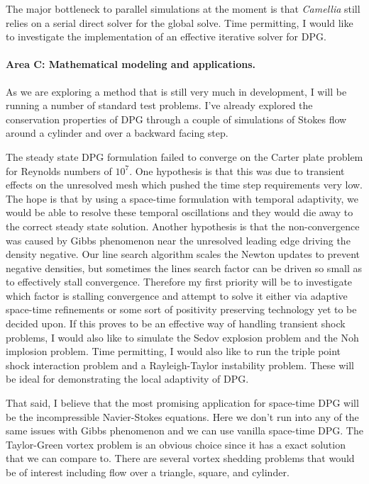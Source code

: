 \documentclass[Proposal.tex]{subfiles}
\begin{document}
The major bottleneck to parallel simulations at the moment is that \emph{Camellia} still relies on a serial direct solver for the global solve.
Time permitting, I would like to investigate the implementation of an effective iterative solver for DPG.

\paragraph{Area C: Mathematical modeling and applications.}
As we are exploring a method that is still very much in development, I will be running a number of standard test problems.
I've already explored the conservation properties of DPG through a couple of simulations of Stokes flow around a cylinder and over
a backward facing step.

The steady state DPG formulation failed to converge on the Carter plate problem for Reynolds numbers of $10^7$. 
One hypothesis is that this was due to transient effects on the unresolved mesh which pushed the time step requirements very low.
The hope is that by using a space-time formulation with temporal adaptivity, we would be able to resolve these temporal oscillations
and they would die away to the correct steady state solution.
Another hypothesis is that the non-convergence was caused by Gibbs phenomenon near the unresolved leading edge driving the density negative.
Our line search algorithm scales the Newton updates to prevent negative densities, but sometimes the lines search factor can be driven so small
as to effectively stall convergence.
Therefore my first priority will be to investigate which factor is stalling convergence and attempt to solve it either via adaptive space-time
refinements or some sort of positivity preserving technology yet to be decided upon.
If this proves to be an effective way of handling transient shock problems, 
I would also like to simulate the Sedov explosion problem and the Noh implosion problem.
Time permitting, I would also like to run the triple point shock interaction problem and a Rayleigh-Taylor instability problem.
These will be ideal for demonstrating the local adaptivity of DPG.

That said, I believe that the most promising application for space-time DPG will be the incompressible Navier-Stokes equations.
Here we don't run into any of the same issues with Gibbs phenomenon and we can use vanilla space-time DPG.
The Taylor-Green vortex problem is an obvious choice since it has a exact solution that we can compare to.
There are several vortex shedding problems that would be of interest including flow over a triangle, square, and cylinder.
\end{document}
